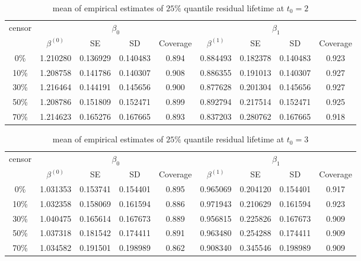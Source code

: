 \documentclass[12pt]{article}
\begin{document}
	\begin{table}[hbt!]
		\caption{mean of empirical estimates of $25\%$ quantile residual lifetime at $t_0=2$}
		\centering
		\begin{tabular}{|c|c|c|c|c|c|c|c|c|}
			\hline
			\multirow{2}{*}{censor} & \multicolumn{4}{c|}{$\beta_0$} & \multicolumn{4}{c|}{$\beta_1$}\\ \cline{2-9}
			& $\beta^(0)$ & SE & SD  & Coverage  & $\beta^(1)$ & SE & SD & Coverage\\
			\hline\hline
			0\% & 1.210280 & 0.136929 & 0.140483 & 0.894 & 0.884493 & 0.182378 & 0.140483 & 0.923 \\
			10\% & 1.208758 & 0.141786 & 0.140307 & 0.908 & 0.886355 & 0.191013 & 0.140307 & 0.927 \\
			30\% & 1.216464 & 0.144191 & 0.145656 & 0.900 & 0.877628 & 0.201304 & 0.145656 & 0.927 \\
			50\% & 1.208786 & 0.151809 & 0.152471 & 0.899 & 0.892794 & 0.217514 & 0.152471 & 0.925 \\
			70\% & 1.214623 & 0.165276 & 0.167665 & 0.893 & 0.837203 & 0.280762 & 0.167665 & 0.918 \\
			\hline
		\end{tabular}
	\end{table}
	\begin{table}[hbt!]
		\caption{mean of empirical estimates of $25\%$ quantile residual lifetime at $t_0=3$}
		\centering
		\begin{tabular}{|c|c|c|c|c|c|c|c|c|}
			\hline
			\multirow{2}{*}{censor} & \multicolumn{4}{c|}{$\beta_0$} & \multicolumn{4}{c|}{$\beta_1$}\\ \cline{2-9}
			& $\beta^(0)$ & SE & SD  & Coverage  & $\beta^(1)$ & SE & SD & Coverage\\
			\hline\hline
			0\% & 1.031353 & 0.153741 & 0.154401 & 0.895 & 0.965069 & 0.204120 & 0.154401 & 0.917 \\
			10\% & 1.032358 & 0.158069 & 0.161594 & 0.886 & 0.971943 & 0.210629 & 0.161594 & 0.923 \\
			30\% & 1.040475 & 0.165614 & 0.167673 & 0.889 & 0.956815 & 0.225826 & 0.167673 & 0.909 \\
			50\% & 1.037318 & 0.181542 & 0.174411 & 0.891 & 0.963480 & 0.254288 & 0.174411 & 0.909 \\
			70\% & 1.034582 & 0.191501 & 0.198989 & 0.862 & 0.908340 & 0.345546 & 0.198989 & 0.909 \\ 
			\hline
		\end{tabular}
	\end{table}
	
\end{document}

